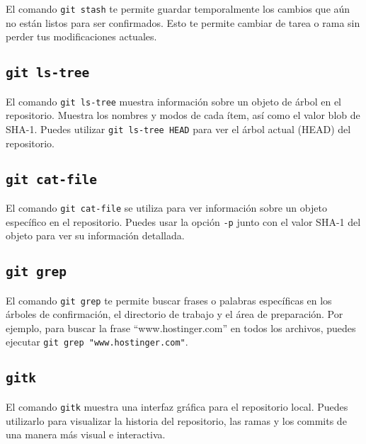 \documentclass[
  letterpaper,
  DIV=11,
  numbers=noendperiod]{scrartcl}
\begin{document}
El comando \texttt{git\ stash} te permite guardar temporalmente los
cambios que aún no están listos para ser confirmados. Esto te permite
cambiar de tarea o rama sin perder tus modificaciones actuales.

\hypertarget{git-ls-tree}{%
\subsection{\texorpdfstring{\texttt{git\ ls-tree}}{git ls-tree}}\label{git-ls-tree}}

El comando \texttt{git\ ls-tree} muestra información sobre un objeto de
árbol en el repositorio. Muestra los nombres y modos de cada ítem, así
como el valor blob de SHA-1. Puedes utilizar \texttt{git\ ls-tree\ HEAD}
para ver el árbol actual (HEAD) del repositorio.

\hypertarget{git-cat-file}{%
\subsection{\texorpdfstring{\texttt{git\ cat-file}}{git cat-file}}\label{git-cat-file}}

El comando \texttt{git\ cat-file} se utiliza para ver información sobre
un objeto específico en el repositorio. Puedes usar la opción
\texttt{-p} junto con el valor SHA-1 del objeto para ver su información
detallada.

\hypertarget{git-grep}{%
\subsection{\texorpdfstring{\texttt{git\ grep}}{git grep}}\label{git-grep}}

El comando \texttt{git\ grep} te permite buscar frases o palabras
específicas en los árboles de confirmación, el directorio de trabajo y
el área de preparación. Por ejemplo, para buscar la frase
``www.hostinger.com'' en todos los archivos, puedes ejecutar
\texttt{git\ grep\ "www.hostinger.com"}.

\hypertarget{gitk}{%
\subsection{\texorpdfstring{\texttt{gitk}}{gitk}}\label{gitk}}

El comando \texttt{gitk} muestra una interfaz gráfica para el
repositorio local. Puedes utilizarlo para visualizar la historia del
repositorio, las ramas y los commits de una manera más visual e
interactiva.
\end{document}
